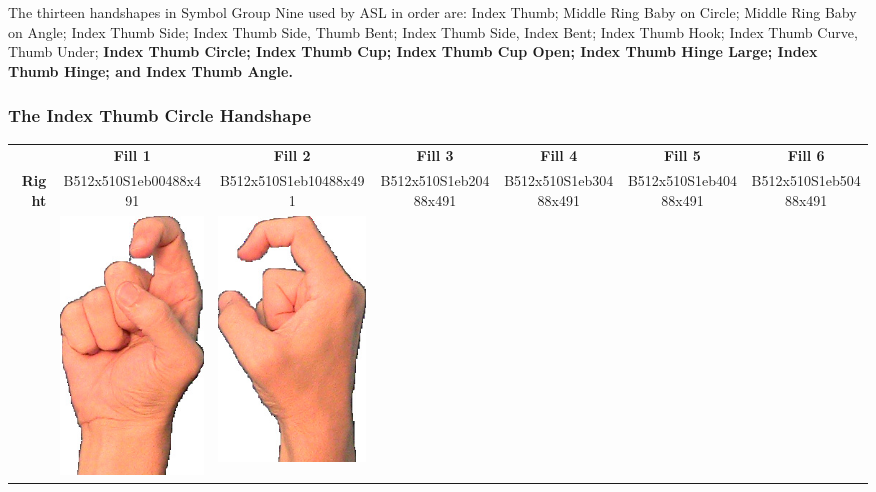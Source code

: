 \documentclass{article}
\begin{document}
The thirteen handshapes in Symbol Group Nine used by ASL in order are:
Index Thumb;
Middle Ring Baby on Circle;
Middle Ring Baby on Angle;
Index Thumb Side;
Index Thumb Side, Thumb Bent;
Index Thumb Side, Index Bent;
Index Thumb Hook;
Index Thumb Curve, Thumb Under;
{\bf
Index Thumb Circle;
Index Thumb Cup;
Index Thumb Cup Open;
Index Thumb Hinge Large;
Index Thumb Hinge;
and Index Thumb Angle.
}

\subsubsection{The Index Thumb Circle Handshape}

\begin{center}
\begin{tabular}{r*{6}{c}}
&\textbf{Fill 1}&\textbf{Fill 2}&\textbf{Fill 3}&\textbf{Fill 4}&\textbf{Fill 5}&\textbf{Fill 6}\\
\multirow{2}{*}{\textbf{Right}}&
B512x510S1eb00488x491&
B512x510S1eb10488x491&
B512x510S1eb20488x491&
B512x510S1eb30488x491&
B512x510S1eb40488x491&
B512x510S1eb50488x491\\
&
\includegraphics[scale=0.1]{images/09-09-1.jpg}&
\includegraphics[scale=0.1]{images/09-09-2.jpg}&

\end{tabular}
\end{center}
\end{document}
